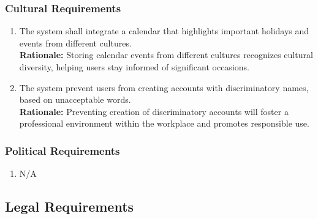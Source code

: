 \documentclass[]{article}
\begin{document}
\subsubsection{Cultural Requirements}
\label{ssub:cultural_requirements}
\begin{enumerate}[{CP-C}1. ]
	\item The system shall integrate a calendar that highlights important holidays and events from different cultures. \\
	      {\bf Rationale:} Storing calendar events from different cultures recognizes cultural diversity, helping users stay informed
	      of significant occasions.
	\item The system prevent users from creating accounts with discriminatory names, based on unacceptable words. \\
	      {\bf Rationale:} Preventing creation of discriminatory accounts will foster a professional environment within the workplace and
	      promotes responsible use.
\end{enumerate}
\subsubsection{Political Requirements}
\label{ssub:political_requirements}
\begin{enumerate}[{CP-P}1. ]
	\item N/A
\end{enumerate}




\subsection{Legal Requirements}
\label{sub:legal_requirements}
\end{document}

